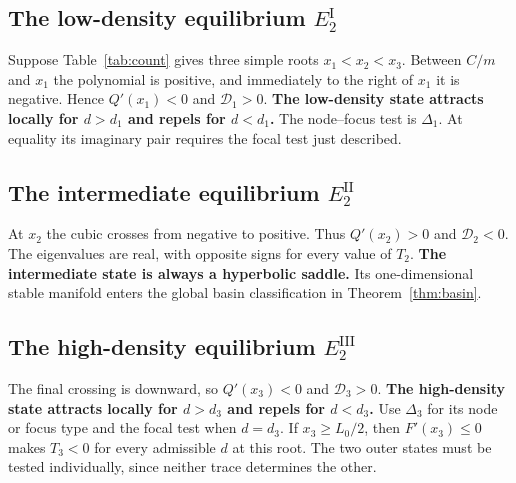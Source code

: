 \documentclass[12pt,a4paper,twoside,fleqn]{article}
\theoremstyle{journal}
\newcommand{\claim}[1]{{\normalfont\bfseries\boldmath #1}}
\newcommand{\Det}{\mathcal D}
\begin{document}
\subsection{The low-density equilibrium \texorpdfstring{\(E_2^{\mathrm I}\)}{E2(I)}}
Suppose Table~\ref{tab:count} gives three simple roots \(x_1<x_2<x_3\). Between \(C/m\) and \(x_1\) the polynomial is positive, and immediately to the right of \(x_1\) it is negative. Hence \(Q'(x_1)<0\) and \(\Det_1>0\). \claim{The low-density state attracts locally for \(d>d_1\) and repels for \(d<d_1\).} The node--focus test is \(\Delta_1\). At equality its imaginary pair requires the focal test just described.

\subsection{The intermediate equilibrium \texorpdfstring{\(E_2^{\mathrm{II}}\)}{E2(II)}}
At \(x_2\) the cubic crosses from negative to positive. Thus \(Q'(x_2)>0\) and \(\Det_2<0\). The eigenvalues are real, with opposite signs for every value of \(T_2\). \claim{The intermediate state is always a hyperbolic saddle.} Its one-dimensional stable manifold enters the global basin classification in Theorem~\ref{thm:basin}.

\subsection{The high-density equilibrium \texorpdfstring{\(E_2^{\mathrm{III}}\)}{E2(III)}}
The final crossing is downward, so \(Q'(x_3)<0\) and \(\Det_3>0\). \claim{The high-density state attracts locally for \(d>d_3\) and repels for \(d<d_3\).} Use \(\Delta_3\) for its node or focus type and the focal test when \(d=d_3\). If \(x_3\ge L_0/2\), then \(F'(x_3)\le0\) makes \(T_3<0\) for every admissible \(d\) at this root. The two outer states must be tested individually, since neither trace determines the other.
\end{document}
